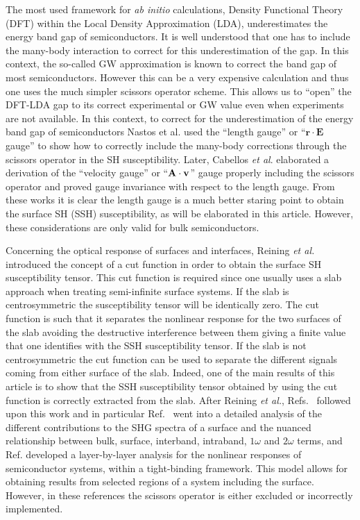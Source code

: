\documentclass[floatfix,prb,aps,superscriptaddress,11pt,preprint,letterpaper]{revtex4}
\begin{document}
The most used framework for \textit{ab initio} calculations, Density 
Functional Theory (DFT) within the Local Density Approximation (LDA),
\cite{kohnPR65} underestimates the energy band gap of semiconductors. It is 
well understood that one has to include the many-body interaction to correct 
for this underestimation of the gap. In this context, the so-called GW 
approximation\cite{onidaRMP02} is known to correct the band gap of most 
semiconductors\cite{luceroJPCM12}. However this can be a very expensive
calculation and thus one uses the much simpler scissors operator scheme.
\cite{levinePRL89,levinePRL91,delsolePRB93}  
This allows us to ``open'' the DFT-LDA gap to 
its correct experimental or GW value even when experiments are not available. 
In this context, to correct for the underestimation of the energy band gap of 
semiconductors Nastos et al.\cite{nastosPRB05} used the ``length gauge'' or 
``$\mathbf{r}\cdot\mathbf{E}$ gauge'' to show how to correctly include the 
many-body corrections through the scissors operator in the SH susceptibility.
Later, Cabellos \textit{et al}.\cite{cabellosPRB09} elaborated a derivation 
of the ``velocity gauge'' or ``$\mathbf{A}\cdot\mathbf{v}$'' gauge properly including the 
scissors operator and proved gauge invariance with respect to the length 
gauge. From these works it is clear the length gauge is a much better staring
point to obtain the surface SH (SSH) susceptibility, as will be elaborated 
in this article. However, these considerations are only valid for bulk 
semiconductors.

Concerning the optical response of surfaces and interfaces, Reining 
\textit{et al.}\cite{reiningPRB94} introduced the concept of a cut function 
in order to obtain the surface SH susceptibility tensor. This cut function 
is required since one usually uses a slab approach when treating semi-infinite 
surface systems. If the slab is centrosymmetric the susceptibility tensor will 
be identically zero. The cut function is such that it separates the nonlinear 
response for the two surfaces of the slab avoiding the destructive 
interference between them giving a finite value that one identifies with the 
SSH susceptibility tensor. If the slab is not centrosymmetric the cut function 
can be used to separate the different signals coming from either surface of 
the slab. Indeed, one of the main results of this article is to show that the 
SSH  susceptibility tensor obtained by using the cut function is correctly 
extracted from the slab. After Reining \textit{et al.},\cite{reiningPRB94}
Refs.~
followed 
upon this work and in particular Ref.~ went into a 
detailed analysis of the different contributions to the SHG spectra of a 
surface and the nuanced relationship between bulk, surface, interband, 
intraband, $1\omega$ and $2\omega$ terms, and
Ref.  developed a layer-by-layer 
analysis for the nonlinear responses of semiconductor systems, within a 
tight-binding framework. This model allows for obtaining results from 
selected regions of a system including the surface. However, in these 
references the scissors operator is either excluded or incorrectly 
implemented.
\end{document}
